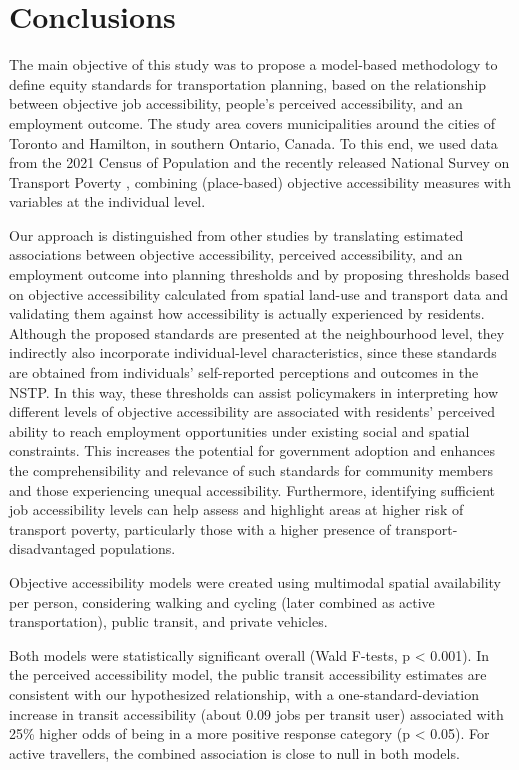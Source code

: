 \documentclass[preprint, 3p,
authoryear]{elsarticle} %
\begin{document}
\section{Conclusions}\label{conclusions}

The main objective of this study was to propose a model-based
methodology to define equity standards for transportation planning,
based on the relationship between objective job accessibility, people's
perceived accessibility, and an employment outcome. The study area
covers municipalities around the cities of Toronto and Hamilton, in
southern Ontario, Canada. To this end, we used data from the 2021 Census
of Population and the recently released National Survey on Transport
Poverty \citep{tiznado-aitken}, combining (place-based) objective
accessibility measures with variables at the individual level.

Our approach is distinguished from other studies by translating
estimated associations between objective accessibility, perceived
accessibility, and an employment outcome into planning thresholds and by
proposing thresholds based on objective accessibility calculated from
spatial land-use and transport data and validating them against how
accessibility is actually experienced by residents. Although the
proposed standards are presented at the neighbourhood level, they
indirectly also incorporate individual-level characteristics, since
these standards are obtained from individuals' self-reported perceptions
and outcomes in the NSTP. In this way, these thresholds can assist
policymakers in interpreting how different levels of objective
accessibility are associated with residents' perceived ability to reach
employment opportunities under existing social and spatial constraints.
This increases the potential for government adoption and enhances the
comprehensibility and relevance of such standards for community members
and those experiencing unequal accessibility. Furthermore, identifying
sufficient job accessibility levels can help assess and highlight areas
at higher risk of transport poverty, particularly those with a higher
presence of transport-disadvantaged populations.

Objective accessibility models were created using multimodal spatial
availability per person, considering walking and cycling (later combined
as active transportation), public transit, and private vehicles.

Both models were statistically significant overall (Wald F-tests, p
\textless{} 0.001). In the perceived accessibility model, the public
transit accessibility estimates are consistent with our hypothesized
relationship, with a one-standard-deviation increase in transit
accessibility (about 0.09 jobs per transit user) associated with 25\%
higher odds of being in a more positive response category (p \textless{}
0.05). For active travellers, the combined association is close to null
in both models.
\end{document}
